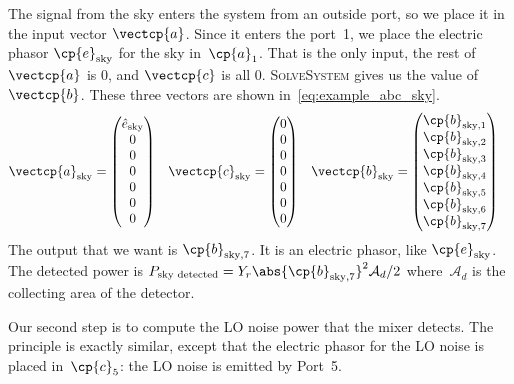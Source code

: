 \begin{refsection}
The signal from the sky enters the system from an outside port, so we place it in the input vector $\vectcp{a}$.
Since it enters the port~1, we place the electric phasor $\cp{e}_\text{sky}$ for the sky in~$\cp{a}_1$.
That is the only input, the rest of~$\vectcp{a}$ is 0, and $\vectcp{c}$ is all 0.
\textsc{SolveSystem} gives us the value of $\vectcp{b}$.
These three vectors are shown in~\cref{eq:example_abc_sky}.
\begin{align}
    \vectcp{a}_\text{sky}
    &=
    \begin{pmatrix}
        \hat{e}_\text{sky} \\ 0 \\ 0 \\ 0 \\ 0 \\ 0 \\ 0
    \end{pmatrix}
    &
    \vectcp{c}_\text{sky}
    &=
    \begin{pmatrix}
        0 \\ 0 \\ 0 \\ 0 \\ 0 \\ 0 \\ 0
    \end{pmatrix}
    &
    \vectcp{b}_\text{sky}
    &=
    \begin{pmatrix}
        \cp{b}_{\text{sky},1}\\
        \cp{b}_{\text{sky},2}\\
        \cp{b}_{\text{sky},3}\\
        \cp{b}_{\text{sky},4}\\
        \cp{b}_{\text{sky},5}\\
        \cp{b}_{\text{sky},6}\\
        \cp{b}_{\text{sky},7}
    \end{pmatrix}
    \label{eq:example_abc_sky}
\end{align}
The output that we want is $\cp{b}_{\text{sky},7}$.
It is an electric phasor, like $\cp{e}_\text{sky}$.
The detected power is
$P_\text{sky detected} = Y_r\abs{\cp{b}_{\text{sky},7}}^2 \mathcal{A}_d/ 2$
where~$\mathcal{A}_d$ is the collecting area of the detector.

Our second step is to compute the LO noise power that the mixer detects.
The principle is exactly similar, except that the electric phasor for the LO noise is placed in~$\cp{c}_5$: the LO noise is emitted by Port~5.


\end{refsection}
